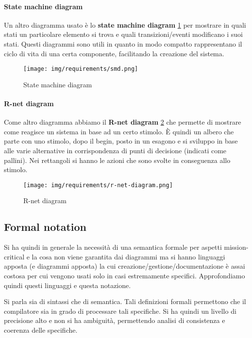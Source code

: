 \paragraph{State machine diagram}
Un altro diagramma usato è lo \textbf{state machine diagram} \ref{fig:smd} per
mostrare in quali stati un particolare elemento si trova e quali transizioni/eventi
modificano i suoi stati. Questi diagrammi sono utili in quanto in modo compatto
rappresentano il ciclo di vita di una certa componente, facilitando la creazione
del sistema.
\begin{figure}[!ht]
    \centering
    \texttt{[image: img/requirements/smd.png]}
    \caption{State machine diagram}
    \label{fig:smd}
\end{figure}
\paragraph{R-net diagram}
Come altro diagramma abbiamo il \textbf{R-net diagram} \ref{fig:r-net-diagram} che permette di mostrare
come reagisce un sistema in base ad un certo stimolo. È quindi un albero che parte
con uno stimolo, dopo il begin, posto in un esagono e si sviluppo in base alle
varie alternative in corrispondenza di punti di decisione (indicati come pallini).
Nei rettangoli si hanno le azioni che sono svolte in conseguenza allo stimolo.
\begin{figure}[!ht]
    \centering
    \texttt{[image: img/requirements/r-net-diagram.png]}
    \caption{R-net diagram}
    \label{fig:r-net-diagram}
\end{figure}


\subsection{Formal notation}
Si ha quindi in generale la necessità di una semantica formale per aspetti
mission-critical e la cosa non viene garantita dai diagrammi ma si hanno linguaggi
apposta (e diagrammi apposta) la cui creazione/gestione/documentazione è assai
costosa per cui vengono usati solo in casi estremamente specifici. Approfondiamo
quindi questi linguaggi e questa notazione.

Si parla sia di sintassi che di semantica. Tali definizioni formali permettono
che il compilatore sia in grado di processare tali specifiche. Si ha quindi un
livello di precisione alto e non si ha ambiguità, permettendo analisi di consistenza
e coerenza delle specifiche.

